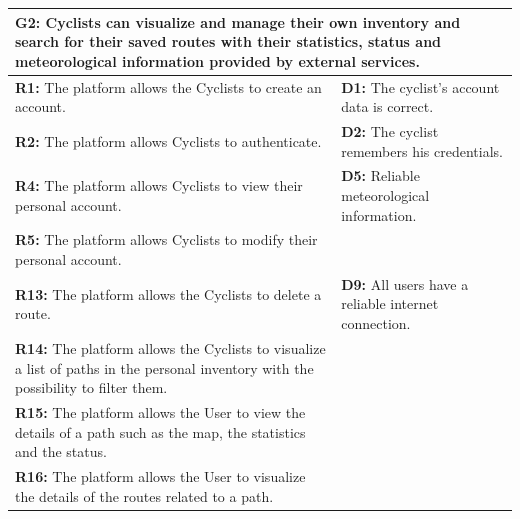 \newpage
\begin{table}[h!]
\centering
\begin{tabular}{|p{7cm}|p{7cm}|}
\hline
\multicolumn{2}{|p{14cm}|}{\textbf{G2:} Cyclists can visualize and manage their own inventory and search for their saved routes with their statistics, status and meteorological information provided by external services.} \\ \hline
\textbf{R1:} The platform allows the Cyclists to create an account. & 
\textbf{D1:} The cyclist’s account data is correct. \\ 
\textbf{R2:} The platform allows Cyclists to authenticate. & 
\textbf{D2:} The cyclist remembers his credentials.\\ 
\textbf{R4:} The platform allows Cyclists to view their personal account. &
\textbf{D5:} Reliable meteorological information.\\ 
\textbf{R5:} The platform allows Cyclists to modify their personal account. & \\ 
\textbf{R13:} The platform allows the Cyclists to delete a route. & 
\textbf{D9:} All users have a reliable internet connection.\\ 
\textbf{R14:} The platform allows the Cyclists to visualize a list of paths in the personal inventory with the possibility to filter them. & \\ 
\textbf{R15:} The platform allows the User to view the details of a path such as the map, the statistics and the status. &\\
\textbf{R16:} The platform allows the User to visualize the details of the routes related to a path. &\\
\hline
\end{tabular}
\end{table}
